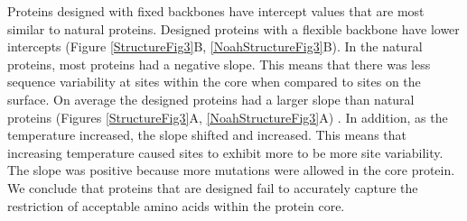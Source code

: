 \documentclass[12pt]{article}
\begin{document}
\par Proteins designed with fixed backbones have intercept values that are most similar to natural proteins. Designed proteins with a flexible backbone have lower intercepts (Figure \ref{StructureFig3}B, \ref{NoahStructureFig3}B). In the natural proteins, most proteins had a negative slope. This means that there was less sequence variability at sites within the core when compared to sites on the surface.  On average the designed proteins had a larger slope than natural proteins (Figures \ref{StructureFig3}A, \ref{NoahStructureFig3}A) . In addition, as the temperature increased, the slope shifted and increased. This means that increasing temperature caused sites to exhibit more to be more site variability. The slope was positive because more mutations were allowed in the core protein. We conclude that proteins that are designed fail to accurately capture the restriction of acceptable amino acids within the protein core. 
\end{document}
